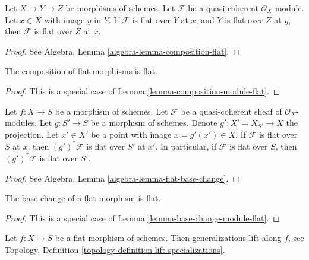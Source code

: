 \begin{lemma}
\label{lemma-composition-module-flat}
Let $X \to Y \to Z$ be morphisms of schemes. Let $\mathcal{F}$ be a
quasi-coherent $\mathcal{O}_X$-module. Let $x \in X$ with image $y$ in $Y$.
If $\mathcal{F}$ is flat over $Y$ at $x$, and $Y$ is flat over $Z$ at
$y$, then $\mathcal{F}$ is flat over $Z$ at $x$.
\end{lemma}

\begin{proof}
See Algebra, Lemma \ref{algebra-lemma-composition-flat}.
\end{proof}

\begin{lemma}
\label{lemma-composition-flat}
The composition of flat morphisms is flat.
\end{lemma}

\begin{proof}
This is a special case of Lemma \ref{lemma-composition-module-flat}.
\end{proof}

\begin{lemma}
\label{lemma-base-change-module-flat}
Let $f : X \to S$ be a morphism of schemes.
Let $\mathcal{F}$ be a quasi-coherent sheaf of $\mathcal{O}_X$-modules.
Let $g : S' \to S$ be a morphism of schemes.
Denote $g' : X' = X_{S'} \to X$ the projection.
Let $x' \in X'$ be a point with image $x = g'(x') \in X$.
If $\mathcal{F}$ is flat over $S$ at $x$, then
$(g')^*\mathcal{F}$ is flat over $S'$ at $x'$.
In particular, if $\mathcal{F}$ is flat over $S$, then
$(g')^*\mathcal{F}$ is flat over $S'$.
\end{lemma}

\begin{proof}
See Algebra, Lemma \ref{algebra-lemma-flat-base-change}.
\end{proof}

\begin{lemma}
\label{lemma-base-change-flat}
The base change of a flat morphism is flat.
\end{lemma}

\begin{proof}
This is a special case of Lemma \ref{lemma-base-change-module-flat}.
\end{proof}

\begin{lemma}
\label{lemma-generalizations-lift-flat}
Let $f : X \to S$ be a flat morphism of schemes.
Then generalizations lift along $f$, see
Topology, Definition \ref{topology-definition-lift-specializations}.
\end{lemma}

